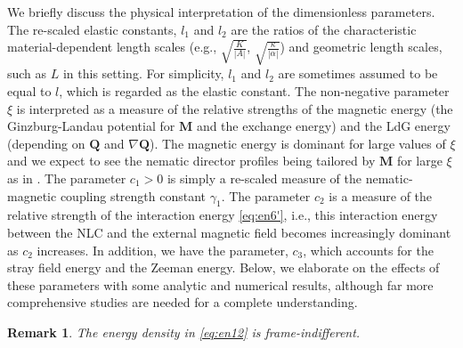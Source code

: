 \documentclass{article}
\newtheorem{remark}[theorem]{Remark}
\def\Qvec{\mathbf{Q}}
\def \Mvec{\mathbf{M}}
\begin{document}
We briefly discuss the physical interpretation of the dimensionless parameters. The re-scaled elastic constants, $l_1$ and $l_2$ are the ratios of the characteristic material-dependent length scales (e.g., $\sqrt{\frac{K}{|A|}}$, $\sqrt{\frac{\kappa}{|\alpha|}}$) and geometric length scales, such as $L$ in this setting. For simplicity, $l_1$ and $l_2$ are sometimes assumed to be equal to $l$, which is regarded as the elastic constant. The non-negative parameter $\xi$ is interpreted as a measure of the relative strengths of the magnetic energy (the Ginzburg-Landau potential for $\Mvec$ and the exchange energy) and the LdG energy (depending on $\Qvec$ and $\nabla \Qvec$). The magnetic energy is dominant for large values of $\xi$ and we expect to see the nematic director profiles being tailored by $\Mvec$ for large $\xi$ as in \cite{Bisht2020}. The parameter $c_1>0$ is simply a re-scaled measure of the nematic-magnetic coupling strength constant $\gamma_1$. The parameter $c_2$ is a measure of the relative strength of the interaction energy \eqref{eq:en6'}, i.e., this interaction energy between the NLC and the external magnetic field becomes increasingly dominant as $c_2$ increases. In addition, we have the parameter, $c_3$, which accounts for the stray field energy and the Zeeman energy. Below, we elaborate on the effects of these parameters with some analytic and numerical results, although far more comprehensive studies are needed for a complete understanding.

\begin{remark}
The energy density in \eqref{eq:en12} is frame-indifferent.
\end{remark}
\end{document}
